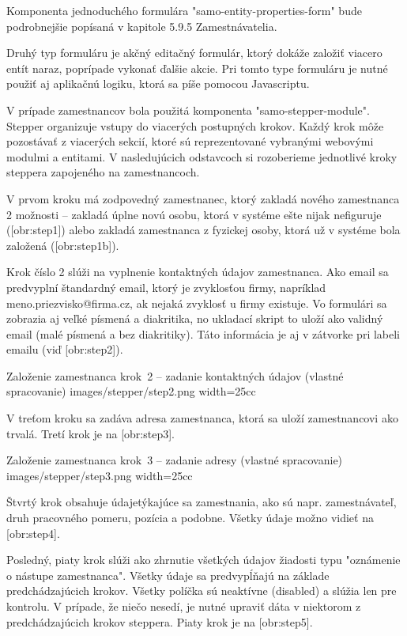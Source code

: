 Komponenta jednoduchého formulára "samo-entity-properties-form" bude podrobnejšie popísaná v kapitole 5.9.5 Zamestnávatelia.

Druhý typ formuláru je akčný editačný formulár, ktorý dokáže založiť viacero entít naraz, poprípade vykonať ďalšie akcie. Pri tomto type formuláru je nutné použiť aj aplikačnú logiku, ktorá sa píše pomocou Javascriptu. 

V prípade zamestnancov bola použitá komponenta "samo-stepper-module". Stepper organizuje vstupy do viacerých postupných krokov. Každý krok môže pozostávať z viacerých sekcií, ktoré sú reprezentované vybranými webovými modulmi a entitami. V nasledujúcich odstavcoch si rozoberieme jednotlivé kroky steppera zapojeného na zamestnancoch.

V prvom kroku má zodpovedný zamestnanec, ktorý zakladá nového zamestnanca 2 možnosti -- zakladá úplne novú osobu, ktorá v systéme ešte nijak nefiguruje ([obr:step1]) alebo zakladá zamestnanca z  fyzickej osoby, ktorá už v systéme bola založená ([obr:step1b]).

Krok číslo 2 slúži na vyplnenie kontaktných údajov zamestnanca. Ako email sa predvyplní štandardný email, ktorý je zvyklosťou firmy, napríklad meno.priezvisko@firma.cz, ak nejaká zvyklosť u firmy existuje. Vo formulári sa zobrazia aj veľké písmená a diakritika, no ukladací skript to uloží ako validný email (malé písmená a bez diakritiky). Táto informácia je aj v zátvorke pri labeli emailu (viď [obr:step2]).

{Založenie zamestnanca krok~2 -- zadanie kontaktných údajov (vlastné spracovanie)}
{images/stepper/step2.png}
{width=25cc} 

V treťom kroku sa zadáva adresa zamestnanca, ktorá sa uloží zamestnancovi ako trvalá. Tretí krok je na [obr:step3].

{Založenie zamestnanca krok~3 -- zadanie adresy (vlastné spracovanie)}
{images/stepper/step3.png}
{width=25cc} 

Štvrtý krok obsahuje údajetýkajúce sa zamestnania, ako sú napr. zamestnávateľ, druh pracovného pomeru, pozícia a podobne. Všetky údaje možno vidieť na [obr:step4].


Posledný, piaty krok slúži ako zhrnutie všetkých údajov žiadosti typu "oznámenie o nástupe zamestnanca". Všetky údaje sa predvypĺňajú na základe predchádzajúcich krokov. Všetky políčka sú neaktívne (disabled) a slúžia len pre kontrolu. V prípade, že niečo nesedí, je nutné upraviť dáta v niektorom z predchádzajúcich krokov steppera. Piaty krok je na [obr:step5].

